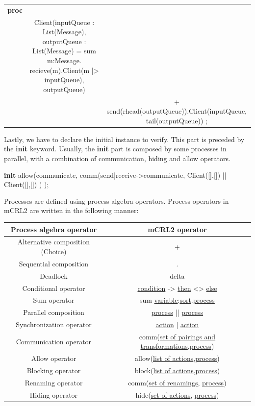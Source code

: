 \documentclass[11pt]{article}
\theoremstyle{definition}
\theoremstyle{plain}
\theoremstyle{definition}
\begin{document}
\begin{tabular}{c c c}
	\textbf{proc} &  & \\
	 & Client(inputQueue : List(Message), outputQueue : List(Message) = sum m:Message. recieve(m).Client(m |> inputQueue), outputQueue) & \\
	 &  & + send(rhead(outputQueue)).Client(inputQueue, tail(outputQueue)) ;
\end{tabular}

Lastly, we have to declare the initial instance to verify. This part is preceded by the \textbf{init} keyword. Usually, the \textbf{init} part is composed by some processes in parallel, with a combination of communication, hiding and allow operators.

\begin{center}
	\textbf{init} allow({communicate},
	comm({send|receive->communicate},
	Client([],[]) || Client([],[])
	)
	);
\end{center}

Processes are defined using process algebra operators. Process operators in mCRL2 are written in the following manner:

\begin{tabular}{c c}
	Process algebra operator & mCRL2 operator \\
	\hline
	Alternative composition (Choice) & + \\
	Sequential composition & . \\
	Deadlock & delta \\
	Conditional operator & \underline{condition} -> \underline{then} <> \underline{else} \\
	Sum operator & sum \underline{variable}:\underline{sort}.\underline{process} \\
	Parallel composition & \underline{process} || \underline{process} \\
	Synchronization operator & \underline{action} | \underline{action} \\
	Communication operator & comm(\underline{set of pairings and transformations},\underline{process}) \\
	Allow operator & allow(\underline{list of actions},\underline{process}) \\
	Blocking operator & block(\underline{list of actions},\underline{process}) \\
	Renaming operator & comm(\underline{set of renamings}, \underline{process}) \\
	Hiding operator & hide(\underline{set of actions}, \underline{process})
\end{tabular} 
\end{document}
